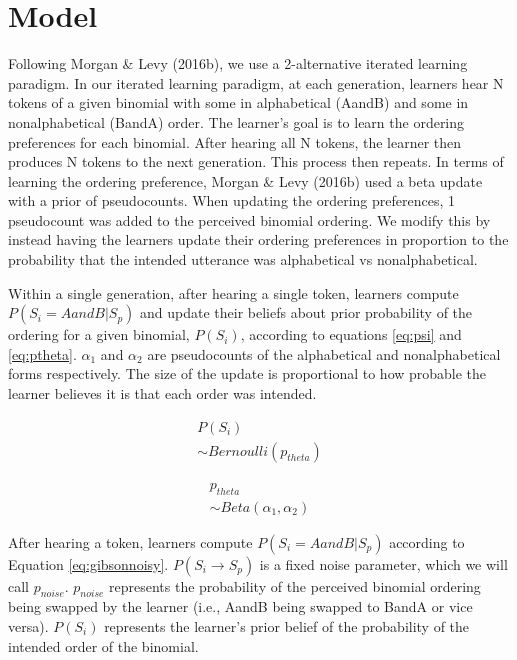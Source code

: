 \documentclass[10pt, letterpaper]{article}
\begin{document}
\hypertarget{model}{%
\section{Model}\label{model}}

Following Morgan \& Levy (2016b), we use a 2-alternative iterated
learning paradigm. In our iterated learning paradigm, at each
generation, learners hear N tokens of a given binomial with some in
alphabetical (AandB) and some in nonalphabetical (BandA) order. The
learner's goal is to learn the ordering preferences for each binomial.
After hearing all N tokens, the learner then produces N tokens to the
next generation. This process then repeats. In terms of learning the
ordering preference, Morgan \& Levy (2016b) used a beta update with a
prior of pseudocounts. When updating the ordering preferences, 1
pseudocount was added to the perceived binomial ordering. We modify this
by instead having the learners update their ordering preferences in
proportion to the probability that the intended utterance was
alphabetical vs nonalphabetical.

Within a single generation, after hearing a single token, learners
compute \(P(S_i = AandB|S_p)\) and update their beliefs about prior
probability of the ordering for a given binomial, \(P(S_i)\), according
to equations \ref{eq:psi} and \ref{eq:ptheta}. \(\alpha_1\) and
\(\alpha_2\) are pseudocounts of the alphabetical and nonalphabetical
forms respectively. The size of the update is proportional to how
probable the learner believes it is that each order was intended.

\begin{multline}
\label{eq:psi}
P(S_i) \\ \sim Bernoulli(p_{theta})
\end{multline}

\begin{multline}
\label{eq:ptheta}
p_{theta} \\ \sim Beta(\alpha_1, \alpha_2)
\end{multline}

After hearing a token, learners compute \(P(S_i = AandB|S_p)\) according
to Equation \ref{eq:gibsonnoisy}. \(P(S_i \to S_p)\) is a fixed noise
parameter, which we will call \(p_{noise}\). \(p_{noise}\) represents
the probability of the perceived binomial ordering being swapped by the
learner (i.e., AandB being swapped to BandA or vice versa). \(P(S_i)\)
represents the learner's prior belief of the probability of the intended
order of the binomial.
\end{document}
